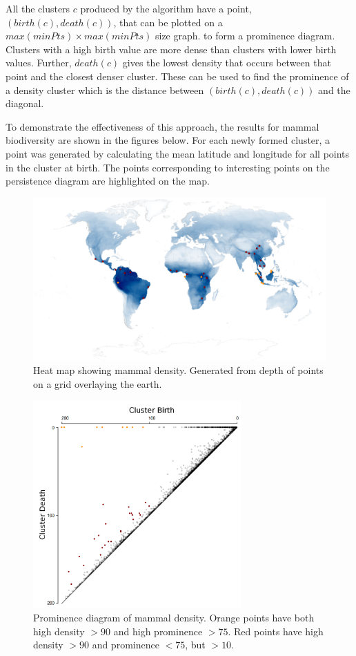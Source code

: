 \documentclass[11pt, fullpage,letterpaper]{article}
\begin{document}
		All the clusters $c$ produced by the algorithm have a point, $(birth(c), death(c))$, that can be plotted on a $max(minPts) \times max(minPts)$ size graph.  to form a prominence diagram. Clusters with a high birth value are more dense than clusters with lower birth values. Further, $death(c)$ gives the lowest density that occurs between that point and the closest denser cluster. These can be used to find the prominence of a density cluster which is the distance between $(birth(c), death(c))$ and the diagonal. 
		
		To demonstrate the effectiveness of this approach, the results for mammal biodiversity are shown in the figures below. For each newly formed cluster, a point was generated by calculating the mean latitude and longitude for all points in the cluster at birth. The points corresponding to interesting points on the persistence diagram are highlighted on the map.
		
		\begin{figure}[H]
			\centering
			\includegraphics[width=17cm]{map.png}
			\caption{Heat map showing mammal density. Generated from depth of points on a grid overlaying the earth.}
		\end{figure}
		
		\begin{figure}[H]
			\centering
			\includegraphics[width=8cm]{graph.png}
			\caption{Prominence diagram of mammal density. Orange points have both high density $>90$ and high prominence $>75$. Red points have high density $>90$ and prominence $<75$, but $>10$.}
		\end{figure}
		
\end{document}
